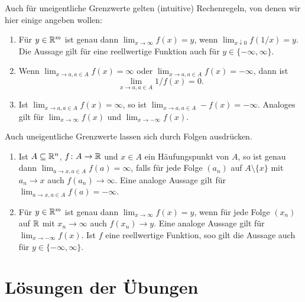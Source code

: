 \documentclass[a4paper,10pt]{article}
\begin{document}
Auch für uneigentliche Grenzwerte gelten (intuitive) Rechenregeln, von denen wir hier einige angeben wollen:
\begin{enumerate}
 \item
  Für $y \in \mathbb{R}^m$ ist genau dann $\lim_{x \to \infty} f(x) = y$, wenn $\lim_{x \downarrow 0} f(1/x) = y$. Die Aussage gilt für eine reellwertige Funktion auch für $y \in \{-\infty, \infty\}$.
 \item
  Wenn $\lim_{x \to a, a \in A} f(x) = \infty$ oder $\lim_{x \to a, a \in A} f(x) = -\infty$, dann ist
  \[
   \lim_{x \to a, a \in A} 1/f(x) = 0.
  \]
 \item
  Ist $\lim_{x \to a, a \in A} f(x) = \infty$, so ist $\lim_{x \to a, a \in A} -f(x) = -\infty$. Analoges gilt für $\lim_{x \to \infty} f(x)$ und $\lim_{x \to -\infty} f(x)$.
\end{enumerate}
Auch uneigentliche Grenzwerte lassen sich durch Folgen ausdrücken.
\begin{enumerate}
 \item
  Ist $A \subseteq \mathbb{R}^n$, $f \colon A \to \mathbb{R}$ und $x \in A$ ein Häufungspunkt von $A$, so ist genau dann $\lim_{a \to x, a \in A} f(a) = \infty$, falls für jede Folge $(a_n)$ auf $A \setminus \{x\}$ mit $a_n \to x$ auch $f(a_n) \to \infty$. Eine analoge Aussage gilt für $\lim_{a \to x, a \in A} f(a) = -\infty$.
 \item
  Für $y \in \mathbb{R}^m$ ist genau dann $\lim_{x \to \infty} f(x) = y$, wenn für jede Folge $(x_n)$ auf $\mathbb{R}$ mit $x_n \to \infty$ auch $f(x_n) \to y$. Eine analoge Aussage gilt für $\lim_{x \to -\infty} f(x)$. Ist $f$ eine reellwertige Funktion, soo gilt die Aussage auch für $y \in \{-\infty, \infty\}$.
\end{enumerate}










\newpage


\section{Lösungen der Übungen}


\printsolutions
\end{document}
